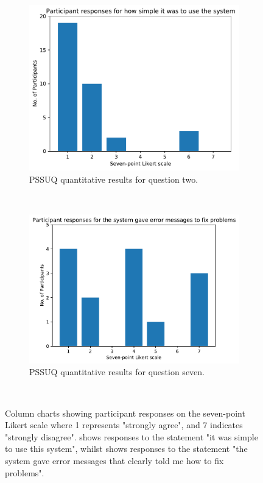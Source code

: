 \documentclass{l4proj}
\begin{document}
\begin{figure}[htb] 
    \centering
    \begin{subfigure}[b]{0.43\textwidth}
        \includegraphics[width=\textwidth]{images/simple_system_responses.pdf}
        \caption{PSSUQ quantitative results for question two.}
        \label{fig:simple_system_responses}
    \end{subfigure}
    ~
    \begin{subfigure}[b]{0.47\textwidth}
        \includegraphics[width=\textwidth]{images/system_error_messages.pdf}
        \caption{PSSUQ quantitative results for question seven.}
        \label{fig:system_error_messages}
    \end{subfigure}
    ~
    \caption{Column charts showing participant responses on the seven-point Likert scale where 1 represents "strongly agree", and 7 indicates "strongly disagree".  shows responses to the statement "it was simple to use this system", whilst  shows responses to the statement "the system gave error messages that clearly told me how to fix problems".}
    \label{fig:quantitative_result_graphs}
\end{figure}
\end{document}
